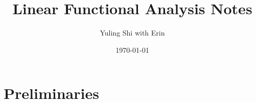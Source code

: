 \documentclass[10pt]{paper}
\title{Linear Functional Analysis Notes}
\date{\today}
\author{{\footnotesize{Yuling Shi}} with Erin}
\newtheorem{definition}{Def}[section]
\begin{document}
\maketitle
\tableofcontents
\footnotesize

\section{Preliminaries}






\end{document}
